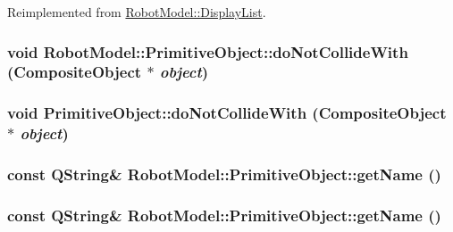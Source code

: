 Reimplemented from \hyperlink{class_robot_model_1_1_display_list_a023ba88eaac38b26dc9ea6a358467637}{RobotModel::DisplayList}.\hypertarget{class_robot_model_1_1_primitive_object_a498038d3817c1c24ddc5b8e9ca7afdf9}{
\subsubsection[{doNotCollideWith}]{\setlength{\rightskip}{0pt plus 5cm}void RobotModel::PrimitiveObject::doNotCollideWith ({\bf CompositeObject} $\ast$ {\em object})}}
\label{class_robot_model_1_1_primitive_object_a498038d3817c1c24ddc5b8e9ca7afdf9}
\hypertarget{class_robot_model_1_1_primitive_object_a8fc60e9e4a29b895d45871d842081605}{
\subsubsection[{doNotCollideWith}]{\setlength{\rightskip}{0pt plus 5cm}void PrimitiveObject::doNotCollideWith ({\bf CompositeObject} $\ast$ {\em object})}}
\label{class_robot_model_1_1_primitive_object_a8fc60e9e4a29b895d45871d842081605}
\hypertarget{class_robot_model_1_1_primitive_object_a2bad14bd18e70f3e95b6ebfca7014d2e}{
\subsubsection[{getName}]{\setlength{\rightskip}{0pt plus 5cm}const QString\& RobotModel::PrimitiveObject::getName ()}}
\label{class_robot_model_1_1_primitive_object_a2bad14bd18e70f3e95b6ebfca7014d2e}
\hypertarget{class_robot_model_1_1_primitive_object_a2bad14bd18e70f3e95b6ebfca7014d2e}{
\subsubsection[{getName}]{\setlength{\rightskip}{0pt plus 5cm}const QString\& RobotModel::PrimitiveObject::getName ()}}
